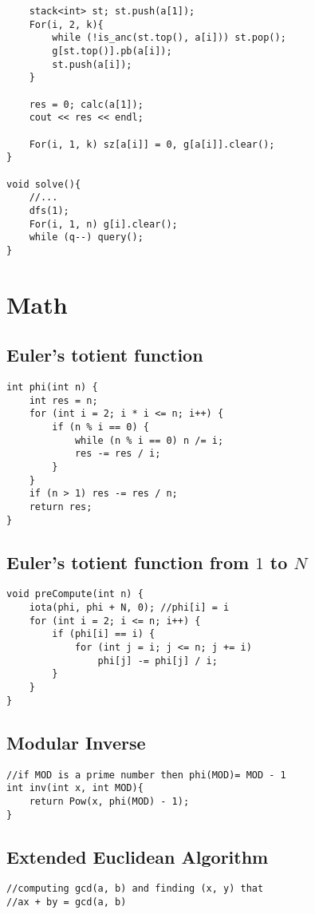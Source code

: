 \documentclass[11pt,a4paper]{article}
\begin{document}
\begin{multicols*}{2}
\begin{lstlisting}
	stack<int> st; st.push(a[1]);
	For(i, 2, k){
		while (!is_anc(st.top(), a[i])) st.pop();
		g[st.top()].pb(a[i]);
		st.push(a[i]);
	}
	
	res = 0; calc(a[1]);
	cout << res << endl;
	
	For(i, 1, k) sz[a[i]] = 0, g[a[i]].clear();
}

void solve(){
	//...	
	dfs(1);
	For(i, 1, n) g[i].clear();
	while (q--) query();
}
\end{lstlisting}

\section{Math}
\subsection{Euler's totient function}
\begin{lstlisting}
int phi(int n) {
    int res = n;
    for (int i = 2; i * i <= n; i++) {
        if (n % i == 0) {
            while (n % i == 0) n /= i;
            res -= res / i;
        }
    }
    if (n > 1) res -= res / n;
    return res;
}
\end{lstlisting}

\subsection{Euler's totient function from $1$ to $N$}
\begin{lstlisting}
void preCompute(int n) {
    iota(phi, phi + N, 0); //phi[i] = i
    for (int i = 2; i <= n; i++) {
        if (phi[i] == i) {
            for (int j = i; j <= n; j += i)
                phi[j] -= phi[j] / i;
        }
    }
}
\end{lstlisting}

\subsection{Modular Inverse}
\begin{lstlisting}
//if MOD is a prime number then phi(MOD)= MOD - 1
int inv(int x, int MOD){
    return Pow(x, phi(MOD) - 1);
}
\end{lstlisting}

\subsection{Extended Euclidean Algorithm}
\begin{lstlisting}
//computing gcd(a, b) and finding (x, y) that
//ax + by = gcd(a, b)


\end{lstlisting}
\end{multicols*}
\end{document}
